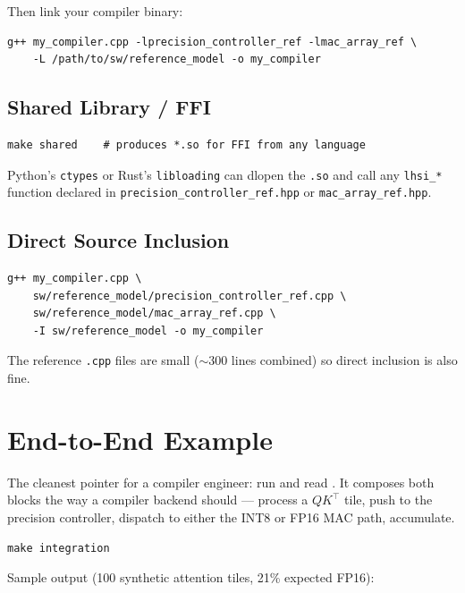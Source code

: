 \documentclass[11pt]{article}
\begin{document}
Then link your compiler binary:
\begin{lstlisting}[basicstyle=\ttfamily\small]
g++ my_compiler.cpp -lprecision_controller_ref -lmac_array_ref \
    -L /path/to/sw/reference_model -o my_compiler
\end{lstlisting}

\subsection{Shared Library / FFI}
\begin{lstlisting}[basicstyle=\ttfamily\small]
make shared    # produces *.so for FFI from any language
\end{lstlisting}

Python's \texttt{ctypes} or Rust's \texttt{libloading} can dlopen
the \texttt{.so} and call any \texttt{lhsi\_*} function declared in
\texttt{precision\_controller\_ref.hpp} or \texttt{mac\_array\_ref.hpp}.

\subsection{Direct Source Inclusion}
\begin{lstlisting}[basicstyle=\ttfamily\small]
g++ my_compiler.cpp \
    sw/reference_model/precision_controller_ref.cpp \
    sw/reference_model/mac_array_ref.cpp \
    -I sw/reference_model -o my_compiler
\end{lstlisting}

The reference \texttt{.cpp} files are small ($\sim$300 lines combined)
so direct inclusion is also fine.

\section{End-to-End Example}
\label{sec:e2e}

The cleanest pointer for a compiler engineer: run and read
. It composes both
blocks the way a compiler backend should --- process a $QK^{\top}$
tile, push to the precision controller, dispatch to either the INT8
or FP16 MAC path, accumulate.

\begin{lstlisting}[basicstyle=\ttfamily\small]
make integration
\end{lstlisting}

\noindent
Sample output (100 synthetic attention tiles, 21\% expected FP16):
\end{document}
